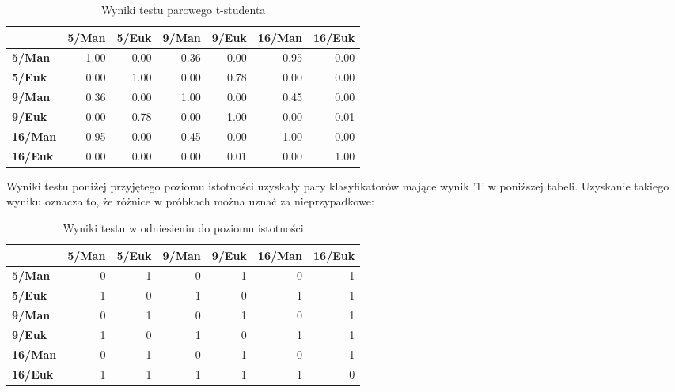 \documentclass[runningheads]{llncs}
\begin{document}
\begin{table}[htbp]
  \centering
  \caption{Wyniki testu parowego t-studenta}
    \begin{tabular}{|l|r|r|r|r|r|r|}
    \hline
      & \multicolumn{1}{l|}{\textbf{5/Man}} & \multicolumn{1}{l|}{\textbf{5/Euk}} & \multicolumn{1}{l|}{\textbf{9/Man}} & \multicolumn{1}{l|}{\textbf{9/Euk}} & \multicolumn{1}{l|}{\textbf{16/Man}} & \multicolumn{1}{l|}{\textbf{16/Euk}} \bigstrut\\
    \hline
    \textbf{5/Man} & 1.00 & 0.00 & 0.36 & 0.00 & 0.95 & 0.00 \bigstrut\\
    \hline
    \textbf{5/Euk} & 0.00 & 1.00 & 0.00 & 0.78 & 0.00 & 0.00 \bigstrut\\
    \hline
    \textbf{9/Man} & 0.36 & 0.00 & 1.00 & 0.00 & 0.45 & 0.00 \bigstrut\\
    \hline
    \textbf{9/Euk} & 0.00 & 0.78 & 0.00 & 1.00 & 0.00 & 0.01 \bigstrut\\
    \hline
    \textbf{16/Man} & 0.95 & 0.00 & 0.45 & 0.00 & 1.00 & 0.00 \bigstrut\\
    \hline
    \textbf{16/Euk} & 0.00 & 0.00 & 0.00 & 0.01 & 0.00 & 1.00 \bigstrut\\
    \hline
    \end{tabular}%
  \label{tab:addlabel}%
\end{table}%



Wyniki testu poniżej przyjętego poziomu istotności uzyskały pary klasyfikatorów mające wynik '1' w poniższej tabeli. Uzyskanie takiego wyniku oznacza to, że różnice w próbkach można uznać za nieprzypadkowe:
\begin{table}[htbp]
  \centering
  \caption{Wyniki testu w odniesieniu do poziomu istotności}
    \begin{tabular}{|l|r|r|r|r|r|r|}
    \hline
      & \multicolumn{1}{l|}{\textbf{5/Man}} & \multicolumn{1}{l|}{\textbf{5/Euk}} & \multicolumn{1}{l|}{\textbf{9/Man}} & \multicolumn{1}{l|}{\textbf{9/Euk}} & \multicolumn{1}{l|}{\textbf{16/Man}} & \multicolumn{1}{l|}{\textbf{16/Euk}} \bigstrut\\
    \hline
    \textbf{5/Man} & 0 & 1 & 0 & 1 & 0 & 1 \bigstrut\\
    \hline
    \textbf{5/Euk} & 1 & 0 & 1 & 0 & 1 & 1 \bigstrut\\
    \hline
    \textbf{9/Man} & 0 & 1 & 0 & 1 & 0 & 1 \bigstrut\\
    \hline
    \textbf{9/Euk} & 1 & 0 & 1 & 0 & 1 & 1 \bigstrut\\
    \hline
    \textbf{16/Man} & 0 & 1 & 0 & 1 & 0 & 1 \bigstrut\\
    \hline
    \textbf{16/Euk} & 1 & 1 & 1 & 1 & 1 & 0 \bigstrut\\
    \hline
    \end{tabular}%
  \label{tab:addlabel}%
\end{table}%
\end{document}
